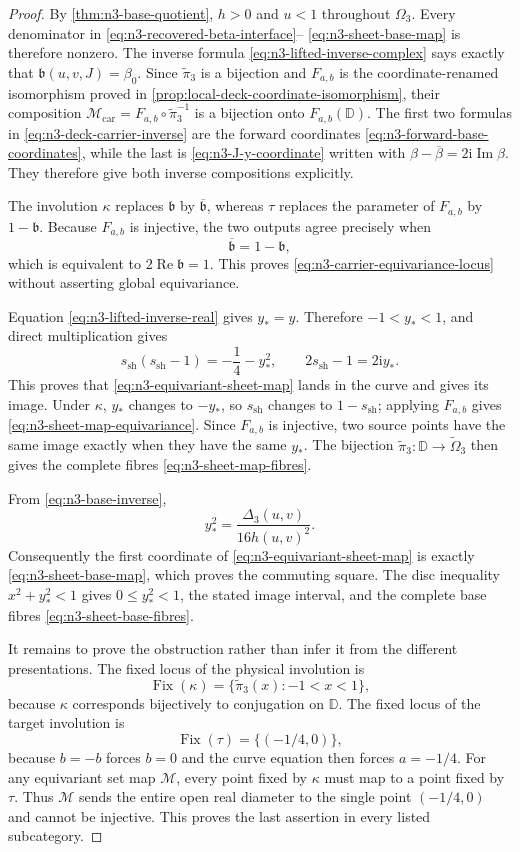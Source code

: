 \begin{proof}
By \cref{thm:n3-base-quotient}, $h>0$ and $u<1$ throughout $\Omega_3$.
Every denominator in \eqref{eq:n3-recovered-beta-interface}--
\eqref{eq:n3-sheet-base-map} is therefore nonzero.  The inverse formula
\eqref{eq:n3-lifted-inverse-complex} says exactly that
$\mathfrak b(u,v,J)=\beta_0$.  Since $\widetilde\pi_3$ is a bijection and
$F_{a,b}$ is the coordinate-renamed isomorphism proved in
\cref{prop:local-deck-coordinate-isomorphism}, their composition
$\mathcal M_{\mathrm{car}}=F_{a,b}\circ\widetilde\pi_3^{-1}$ is a
bijection onto $F_{a,b}(\mathbb D)$.  The first two formulas in
\eqref{eq:n3-deck-carrier-inverse} are the forward coordinates
\eqref{eq:n3-forward-base-coordinates}, while the last is
\eqref{eq:n3-J-y-coordinate} written with
$\beta-\overline\beta=2\mathrm i\operatorname{Im}\beta$.  They therefore
give both inverse compositions explicitly.

The involution $\kappa$ replaces $\mathfrak b$ by $\overline{\mathfrak b}$,
whereas $\tau$ replaces the parameter of $F_{a,b}$ by $1-\mathfrak b$.
Because $F_{a,b}$ is injective, the two outputs agree precisely when
\[
 \overline{\mathfrak b}=1-\mathfrak b,
\]
which is equivalent to $2\operatorname{Re}\mathfrak b=1$.  This proves
\eqref{eq:n3-carrier-equivariance-locus} without asserting global
equivariance.

Equation \eqref{eq:n3-lifted-inverse-real} gives $y_*=y$.  Therefore
$-1<y_*<1$, and direct multiplication gives
\[
 s_{\mathrm{sh}}(s_{\mathrm{sh}}-1)
 =-\frac14-y_*^2,
 \qquad
 2s_{\mathrm{sh}}-1=2\mathrm i y_*.
\]
This proves that \eqref{eq:n3-equivariant-sheet-map} lands in the curve and
gives its image.  Under $\kappa$, $y_*$ changes to $-y_*$, so
$s_{\mathrm{sh}}$ changes to $1-s_{\mathrm{sh}}$; applying $F_{a,b}$ gives
\eqref{eq:n3-sheet-map-equivariance}.  Since $F_{a,b}$ is injective, two
source points have the same image exactly when they have the same $y_*$.  The
bijection $\widetilde\pi_3:\mathbb D\to\widetilde\Omega_3$ then gives the
complete fibres \eqref{eq:n3-sheet-map-fibres}.

From \eqref{eq:n3-base-inverse},
\[
 y_*^2=\frac{\Delta_3(u,v)}{16h(u,v)^2}.
\]
Consequently the first coordinate of \eqref{eq:n3-equivariant-sheet-map} is
exactly \eqref{eq:n3-sheet-base-map}, which proves the commuting square.  The
disc inequality $x^2+y_*^2<1$ gives $0\le y_*^2<1$, the stated image interval,
and the complete base fibres \eqref{eq:n3-sheet-base-fibres}.

It remains to prove the obstruction rather than infer it from the different
presentations.  The fixed locus of the physical involution is
\[
 \operatorname{Fix}(\kappa)
 =\{\widetilde\pi_3(x):-1<x<1\},
\]
because $\kappa$ corresponds bijectively to conjugation on $\mathbb D$.  The
fixed locus of the target involution is
\[
 \operatorname{Fix}(\tau)=\{(-1/4,0)\},
\]
because $b=-b$ forces $b=0$ and the curve equation then forces $a=-1/4$.
For any equivariant set map $\mathcal M$, every point fixed by $\kappa$ must
map to a point fixed by $\tau$.  Thus $\mathcal M$ sends the entire open real
diameter to the single point $(-1/4,0)$ and cannot be injective.  This proves
the last assertion in every listed subcategory.
\end{proof}

